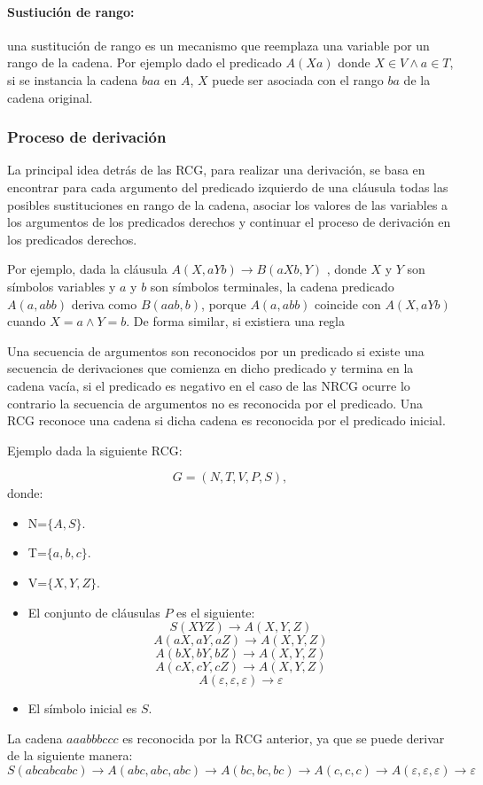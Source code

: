 \documentclass{article}
\begin{document}
\paragraph{Sustiución de rango:} una sustitución de rango es un mecanismo que reemplaza una variable por un rango de la cadena.
Por ejemplo dado el predicado $A(Xa)$ donde $X \in V \wedge a \in T$, si se instancia la cadena $baa$ en $A$, $X$ puede
ser asociada con el rango $ba$ de la cadena original.

\subsubsection{Proceso de derivación}

La principal idea detrás de las RCG, para realizar una derivación, se basa en encontrar para cada argumento del predicado izquierdo de una cláusula todas las
posibles sustituciones en rango de la cadena, asociar los valores de las variables a los argumentos de los predicados derechos y continuar
el proceso de derivación en los predicados derechos.

Por ejemplo, dada la cláusula $A(X,aYb)\to B(aXb,Y)$ , donde $X$ y $Y$ son símbolos variables y $a$ y $b$
son símbolos terminales, la cadena predicado $A(a,abb)$ deriva como $B(aab,b)$, porque $A(a,abb)$
coincide con $A(X,aYb)$ cuando $ X=a \wedge Y=b$. De forma similar, si existiera una regla

Una secuencia de argumentos son reconocidos por un predicado si existe una secuencia de derivaciones que comienza
en dicho predicado y termina en la cadena vacía, si el predicado es negativo en el caso de las NRCG ocurre lo contrario
la secuencia de argumentos no es reconocida por el predicado. Una RCG reconoce una cadena si dicha cadena es reconocida
por el predicado inicial.

Ejemplo dada la siguiente RCG:

\[
      G = (N, T, V, P, S),
\]
donde:

\begin{itemize}
      \item  N=$\{A,S\}$.
      \item T=$\{a,b,c\}$.
      \item V=$\{X,Y,Z\}$.
      \item El conjunto de cláusulas $P$ es el siguiente:
            $$S(XYZ)\to A(X,Y,Z)$$
            $$A(aX,aY,aZ)\to A(X,Y,Z)$$
            $$A(bX,bY,bZ)\to A(X,Y,Z)$$
            $$A(cX,cY,cZ)\to A(X,Y,Z)$$
            $$A(\varepsilon,\varepsilon,\varepsilon)\to \varepsilon$$
      \item El símbolo inicial es $S$.
\end{itemize}
La cadena $aaabbbccc$ es reconocida por la RCG anterior, ya que se puede derivar de la siguiente manera:
$$S(abcabcabc)\to A(abc,abc,abc)\to A(bc,bc,bc)\to A(c,c,c)\to A(\varepsilon,\varepsilon,\varepsilon)\to \varepsilon$$
\end{document}
